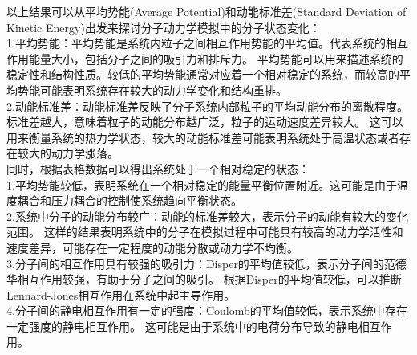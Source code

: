 \documentclass[12pt, a4paper, oneside]{ctexart}
\begin{document}
\begin{spacing}{2.0}
以上结果可以从平均势能(Average Potential)和动能标准差(Standard Deviation of Kinetic Energy)出发来探讨分子动力学模拟中的分子状态变化：\\
1.平均势能：平均势能是系统内粒子之间相互作用势能的平均值。代表系统的相互作用能量大小，包括分子之间的吸引力和排斥力。
平均势能可以用来描述系统的稳定性和结构性质。较低的平均势能通常对应着一个相对稳定的系统，而较高的平均势能可能表明系统存在较大的动力学变化和结构重排。
\\
2.动能标准差：动能标准差反映了分子系统内部粒子的平均动能分布的离散程度。标准差越大，意味着粒子的动能分布越广泛，粒子的运动速度差异较大。
这可以用来衡量系统的热力学状态，较大的动能标准差可能表明系统处于高温状态或者存在较大的动力学涨落。\\

同时，根据表格数据可以得出系统处于一个相对稳定的状态：\\
1.平均势能较低，表明系统在一个相对稳定的能量平衡位置附近。这可能是由于温度耦合和压力耦合的控制使系统趋向平衡状态。
\\
2.系统中分子的动能分布较广：动能的标准差较大，表示分子的动能有较大的变化范围。
这样的结果表明系统中的分子在模拟过程中可能具有较高的动力学活性和速度差异，可能存在一定程度的动能分散或动力学不均衡。
\\
3.分子间的相互作用具有较强的吸引力：Disper的平均值较低，表示分子间的范德华相互作用较强，有助于分子之间的吸引。
根据Disper的平均值较低，可以推断Lennard-Jones相互作用在系统中起主导作用。
\\
4.分子间的静电相互作用有一定的强度：Coulomb的平均值较低，表示系统中存在一定强度的静电相互作用。
这可能是由于系统中的电荷分布导致的静电相互作用。
\\

\end{spacing}
\end{document}
